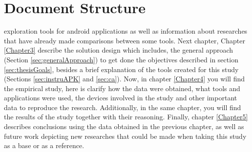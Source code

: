 \section{Document Structure}

exploration tools for android applications as well as information about researches that have already made comparisons between some tools. Next chapter, Chapter \ref{Chapter3} describe the solution design which includes, the general approach (Section \ref{sec:generalApproach}) to get done the objectives described in section \ref{sec:thesisGoals}, besides a brief explanation of the tools created for this study (Sections \ref{sec:instruAPK} and \ref{sec:ca}). Now, in chapter \ref{Chapter4} you will find the empirical study, here is clarify how the data were obtained, what tools and applications were used, the devices involved in the study and other important data to reproduce the research. Additionally, in the same chapter, you will find the results of the study together with their reasoning. Finally, chapter \ref{Chapter5} describes conclusions using the data obtained in the previous chapter, as well as future work depicting new researches that could be made when taking this study as a base or as a reference.